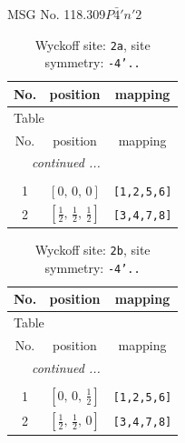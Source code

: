 \documentclass[fleqn,8pt]{jsarticle}
\begin{document}
\setcounter{MaxMatrixCols}{32}

\renewcommand{\tablename}{Table~}
\renewcommand{\figurename}{Figure~}
\begin{center}
\LARGE
MSG No. 118.309\quad$P\bar{4}'n'2$
\end{center}
\renewcommand{\arraystretch}{1.2}
\begin{longtable}{ccc}
\caption{Wyckoff site: {\tt 2a}, site symmetry: {\tt -4'..}}
 \\
 \hline \hline
No. & position & mapping \\ \hline \endfirsthead

\multicolumn{2}{l}{\tablename\ \thetable{}} \\
 \hline \hline
No. & position & mapping \\ \hline \endhead

 \hline \hline
\multicolumn{2}{r}{\footnotesize\it continued ...} \\ \endfoot

 \hline \hline
\multicolumn{2}{r}{} \\ \endlastfoot

1 & $\left[ 0,\, 0,\, 0 \right]$ & {\tt [1,2,5,6]} \\ \hline
2 & $\left[ \frac{1}{2},\, \frac{1}{2},\, \frac{1}{2} \right]$ & {\tt [3,4,7,8]} \\
\end{longtable}
\renewcommand{\arraystretch}{1.2}
\begin{longtable}{ccc}
\caption{Wyckoff site: {\tt 2b}, site symmetry: {\tt -4'..}}
 \\
 \hline \hline
No. & position & mapping \\ \hline \endfirsthead

\multicolumn{2}{l}{\tablename\ \thetable{}} \\
 \hline \hline
No. & position & mapping \\ \hline \endhead

 \hline \hline
\multicolumn{2}{r}{\footnotesize\it continued ...} \\ \endfoot

 \hline \hline
\multicolumn{2}{r}{} \\ \endlastfoot

1 & $\left[ 0,\, 0,\, \frac{1}{2} \right]$ & {\tt [1,2,5,6]} \\ \hline
2 & $\left[ \frac{1}{2},\, \frac{1}{2},\, 0 \right]$ & {\tt [3,4,7,8]} \\
\end{longtable}
\end{document}
